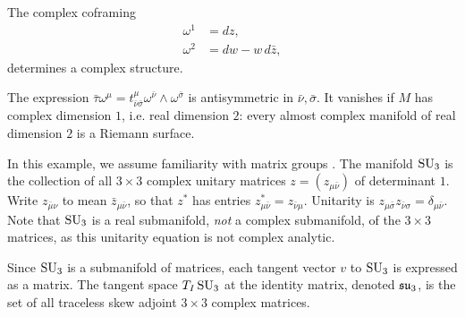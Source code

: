 \begin{example}
The complex coframing
\begin{align*}
\omega^1&=dz,\\
\omega^2&=dw-w\,d\bar{z},
\end{align*}
determines a complex structure.
\end{example}
\begin{example}
The expression \(\bar\tau\omega^{\mu}=t^{\mu}_{\bar\nu\bar\sigma}\omega^{\bar{\nu}}\wedge\omega^{\bar{\sigma}}\) is antisymmetric in \(\bar\nu,\bar\sigma\).
It vanishes if \(M\) has complex dimension \(1\), i.e. real dimension \(2\):
every almost complex manifold of real dimension \(2\) is a Riemann surface.
\end{example}
\begin{example}
In this example, we assume familiarity with matrix groups \cite{Stillwell:2008}.
The manifold \(\operatorname{SU}_{3}\) is the collection of all \(3\times3\) complex unitary matrices \(z=(z_{\mu\bar\nu})\) of determinant \(1\).
Write \(z_{\bar\mu\nu}\) to mean \(\bar{z}_{\mu\bar\nu}\), so that \(z^*\) has entries \(z^*_{\mu\bar\nu}=z_{\bar\nu\mu}\).
Unitarity is \(z_{\mu\bar\sigma}z_{\bar\nu\sigma}=\delta_{\mu\bar\nu}\).
Note that \(\operatorname{SU}_{3}\) is a real submanifold, \emph{not} a complex submanifold, of the \(3\times3\) matrices, as this unitarity equation is not complex analytic.

Since \(\operatorname{SU}_{3}\) is a submanifold of matrices, each tangent vector \(v\) to \(\operatorname{SU}_{3}\) is expressed as a matrix.
The tangent space \(T_I \operatorname{SU}_{3}\) at the identity matrix, denoted \(\LieSU_3\), is the set of all traceless skew adjoint \(3\times3\) complex matrices.


\end{example}
